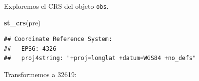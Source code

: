 \documentclass[11pt,]{article}
\newenvironment{Shaded}{\begin{snugshade}}{\end{snugshade}}
\newcommand{\KeywordTok}[1]{\textcolor[rgb]{0.13,0.29,0.53}{\textbf{#1}}}
\newcommand{\DataTypeTok}[1]{\textcolor[rgb]{0.13,0.29,0.53}{#1}}
\newcommand{\DecValTok}[1]{\textcolor[rgb]{0.00,0.00,0.81}{#1}}
\newcommand{\StringTok}[1]{\textcolor[rgb]{0.31,0.60,0.02}{#1}}
\newcommand{\OperatorTok}[1]{\textcolor[rgb]{0.81,0.36,0.00}{\textbf{#1}}}
\newcommand{\NormalTok}[1]{#1}
\begin{document}
Exploremos el CRS del objeto \texttt{obs}.

\begin{Shaded}
\begin{Highlighting}[]
\KeywordTok{st_crs}\NormalTok{(pre)}
\end{Highlighting}
\end{Shaded}

\begin{verbatim}
## Coordinate Reference System:
##   EPSG: 4326 
##   proj4string: "+proj=longlat +datum=WGS84 +no_defs"
\end{verbatim}

Transformemos a 32619:

\begin{Shaded}
\end{Shaded}
\end{document}
